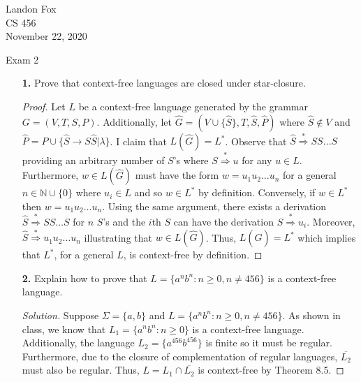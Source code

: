 \documentclass[ 12pt ]{article}
\begin{document}
\noindent Landon Fox \\
\noindent CS 456 \\
\noindent November 22, 2020

\begin{center}
	\Large Exam 2
\end{center}

\begin{enumerate}
	\item[\textbf{1.}] Prove that context-free languages are closed under star-closure.

		\begin{proof}
			Let $L$ be a context-free language generated by the grammar $G = (V, T, S, P)$. Additionally, let $\widehat{G} = (V \cup \{ \widehat{S} \}, T, \widehat{S}, \widehat{P})$
			where $\widehat{S} \notin V$ and $\widehat{P} = P \cup \{ \widehat{S} \to S\widehat{S} | \lambda \}$. I claim that $L(\widehat{G}) = L^*$. Observe that $\widehat{S}
			\overset{*}{\Rightarrow} SS \hdots S$ providing an arbitrary number of $S$'s where $S \overset{*}{\Rightarrow} u$ for any $u \in L$. Furthermore, $w \in L(\widehat{G})$ must
			have the form $w = u_1 u_2 \hdots u_n$ for a general $n \in \mathbb{N} \cup \{ 0 \}$ where $u_i \in L$ and so $w \in L^*$ by definition. Conversely, if $w \in L^*$ then $w =
			u_1 u_2 \hdots u_n$. Using the same argument, there exists a derivation $\widehat{S} \overset{*}{\Rightarrow} SS \hdots S$ for $n$ $S$'s and the $i$th $S$ can have the
			derivation $S \overset{*}{\Rightarrow} u_i$. Moreover, $\widehat{S} \overset{*}{\Rightarrow} u_1 u_2 \hdots u_n$ illustrating that $w \in L(\widehat{G})$. Thus,
			$L(\widehat{G}) = L^*$ which implies that $L^*$, for a general $L$, is context-free by definition.
		\end{proof}


	\item[\textbf{2.}] Explain how to prove that $L = \{ a^n b^n : n \geq 0, n \neq 456 \}$ is a context-free language.

		\begin{proof}[Solution]
			Suppose $\Sigma = \{ a, b \}$ and $L = \{ a^n b^n : n \geq 0, n \neq 456 \}$. As shown in class, we know that $L_1 = \{ a^n b^n : n \geq 0 \}$ is a context-free language.
			Additionally, the language $L_2 = \{ a^{456} b^{456} \}$ is finite so it must be regular. Furthermore, due to the closure of complementation of regular languages,
			$\overline{L_2}$ must also be regular. Thus, $L = L_1 \cap \overline{L_2}$ is context-free by Theorem 8.5.
		\end{proof}



\end{enumerate}
\end{document}
